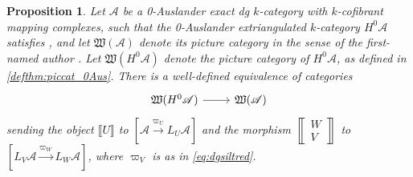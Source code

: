 \documentclass[10pt,twoside, a4paper,reqno]{amsart}
\newcommand{\eqclass}[1]{ \llbracket #1 \rrbracket }
\newcommand{\sqbinom}[2]{\left\llbracket \!\begin{smallmatrix} #1 \\ #2 \end{smallmatrix}\!\right\rrbracket}
\newcommand{\tcmc}[1]{\mathfrak{W}(#1)}
\newcommand{\A}{\mathscr{A}}
\newcommand{\Wfrak}{\mathfrak{W}}
\newtheorem{proposition}[theorem]{Proposition}
\theoremstyle{definition}
\begin{document}
\begin{proposition}\label{prop:sameasBor}
    Let $\A$ be a 0-Auslander exact dg $k$-category with $k$-cofibrant mapping complexes, such that the 0-Auslander extriangulated $k$-category $H^0\A$ satisfies , and let $\tcmc{\A}$ denote its picture category in the sense of the first-named author \cite[§6]{Bor24}. Let $\Wfrak(H^0\A)$ denote the picture category of $H^0\A$, as defined in \eqref{defthm:piccat_0Aus}. There is a well-defined equivalence of categories
    \begin{equation}\label{eq:cat_fan=tcmc}
    \begin{tikzcd}
        \tcmc{H^0\A} \arrow[r] & \tcmc{\A}
    \end{tikzcd}
    \end{equation}
sending the object $\eqclass{{U}}$ to $[\A \xrightarrow{\varpi_U} {L_U\A}]$ and the morphism $\sqbinom{W}{V}$ to $[ {L_V\A} \xrightarrow{\varpi_W}  {L_W\A}]$, where $\varpi_V$ is as in \eqref{eq:dgsiltred}.
\end{proposition}
\end{document}
